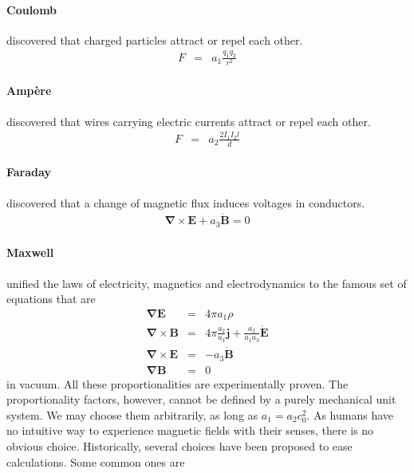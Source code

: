 \documentclass[12pt,a4paper,twoside,openright,BCOR10mm,headsepline,titlepage,abstracton,chapterprefix,final]{scrreprt}
\newcommand\Vector[1]{{\mathbf{#1}}}
\newcommand\Nabla{\Vector{\nabla}}
\newcommand\scalarEfield{E}
\newcommand\scalarBfield{B}
\newcommand\Efield{\Vector{\scalarEfield}}
\newcommand\Bfield{\Vector{\scalarBfield}}
\newcommand\currentdensity{\Vector{j}}
\newcommand\chargedensity{\rho}
\begin{document}
\paragraph{Coulomb} 
discovered that charged particles attract or repel each other.
\begin{eqnarray}
 F &=& a_1 \frac{q_1 q_2}{r^2}
\end{eqnarray}
\paragraph{Amp\`{e}re} 
discovered that wires carrying electric currents attract or repel each other.
\begin{eqnarray}
 F &=& a_2 \frac{2 I_1 I_2 l}{d}
\end{eqnarray}
\paragraph{Faraday}
discovered that a change of magnetic flux induces voltages in conductors.
\begin{eqnarray}
 \Nabla \times \Efield + a_3 \dot{\Bfield} = 0
\end{eqnarray}
\paragraph{Maxwell} 
unified the laws of electricity, magnetics and electrodynamics to the famous set of equations that are
\begin{eqnarray}
 \Nabla \Efield &=& 4 \pi a_1 \chargedensity \\
 \Nabla \times \Bfield &=& 4 \pi \frac{a_2}{a_3} \currentdensity + \frac{a_2}{a_1 a_3} \dot{\Efield} \\
 \Nabla \times \Efield &=& - a_3 \dot{\Bfield} \\
 \Nabla \Bfield &=& 0
\end{eqnarray}
in vacuum.
All these proportionalities are experimentally proven.
The proportionality factors, however, cannot be defined by a purely mechanical unit system. We may choose them arbitrarily,
as long as $a_1 = a_2 c_0^2$.
As humans have no intuitive way to experience magnetic fields with their senses,
there is no obvious choice.
Historically, several choices have been proposed to ease calculations.
Some common ones are
\end{document}
